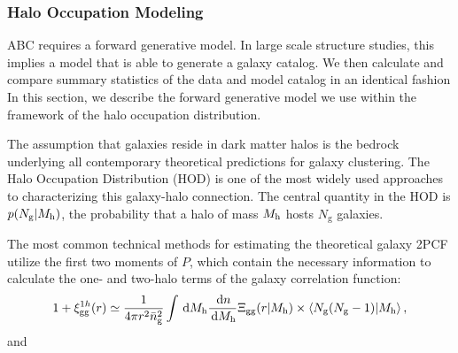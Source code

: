 \subsubsection{Halo Occupation Modeling}

\newcommand{\lcdm}{\Lambda {\rm CDM}}
\newcommand{\mean}[2]{\left\langle#1 \vert {#2}\right\rangle}

\newcommand{\ngal}{N_{\mathrm{g}}}
\newcommand{\nsat}{N_\mathrm{s}}
\newcommand{\ncen}{N_\mathrm{c}}
\newcommand{\pnm}[2]{p(#1|#2)}

\newcommand{\mhalo}{M_{\rm h}}
\newcommand{\mvir}{M_\mathrm{vir}} 

\newcommand{\dndmvir}{\frac{\dd n}{\dd\mvir}}
\newcommand{\dndmhalo}{\frac{\dd n}{\dd\mhalo}}
\newcommand{\dndmvirprime}{\frac{\dd n}{\dd\mvir'}}

\newcommand{\xigg}{\xi_{\mathrm{gg}}}
\newcommand{\xihh}{\xi_{\mathrm{hh}}}
\newcommand{\xiggr}{\xi_{\mathrm{gg}}(r)}
\newcommand{\xiggroneh}{\xi^{1h}_{\mathrm{gg}}(r)}
\newcommand{\xiggrtwoh}{\xi^{2h}_{\mathrm{gg}}(r)}
\newcommand{\ngalaxy}{\bar{n}_{\mathrm{g}}}
\newcommand{\gmf}{\mathcal{\zeta}_{\rm g}}

ABC requires a forward generative model. In large scale structure studies, this implies a model
that is able to generate a galaxy catalog. We then calculate and compare summary statistics of the data and model catalog in an identical fashion
In this section, we describe the forward generative model we use within the framework of the 
halo occupation distribution.

The assumption that galaxies reside in dark matter halos is the bedrock underlying 
all contemporary theoretical predictions for galaxy clustering. The Halo Occupation Distribution 
(HOD) is one of the most widely used approaches to characterizing this galaxy-halo connection. 
The central quantity in the HOD is $\pnm{\ngal}{\mhalo}$, the probability that a halo of mass 
$\mhalo$ hosts $\ngal$ galaxies. 

The most common technical methods for estimating the theoretical galaxy 2PCF utilize the 
first two moments of $P$, which contain the necessary information to calculate the one- 
and two-halo terms of the galaxy correlation function:
\begin{eqnarray}
\label{eq:onehaloterm}
1+\xiggroneh \simeq \frac{1}{4\pi{}r^{2}\ngalaxy^{2}}\int\dd\mhalo\dndmhalo\Xi_{\rm gg}(r|\mhalo) \times \mean{\ngal(\ngal-1)}{\mhalo},
\end{eqnarray} and

